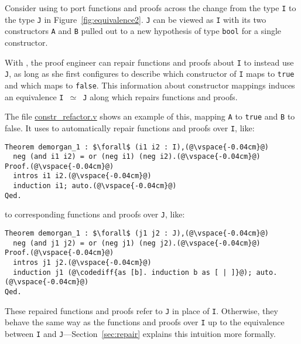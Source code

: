 Consider using \toolname to port functions and proofs across the change from the type \lstinline{I} to the type \lstinline{J} 
in Figure~\ref{fig:equivalence2}.
\lstinline{J} can be viewed as \lstinline{I} with its two constructors \lstinline{A} and \lstinline{B} pulled out to a
new hypothesis of type \lstinline{bool} for a single constructor.

With \toolname, the proof engineer can repair functions and proofs about \lstinline{I} to instead use \lstinline{J},
as long as she first configures \toolname to describe which constructor 
of \lstinline{I} maps to \lstinline{true} and which maps to \lstinline{false}.
This information about constructor mappings induces an equivalence \lstinline{I }$\simeq$\lstinline{ J}
along which \toolname repairs functions and proofs.

The file \href{https://github.com/uwplse/pumpkin-pi/blob/master/plugin/coq/playground/constr_refactor.v}{constr_refactor.v}
shows an example of this, mapping \lstinline{A} to \lstinline{true} and \lstinline{B} to false.
It uses \toolname to automatically repair functions and proofs over \lstinline{I}, like:

\begin{lstlisting}
Theorem demorgan_1 : $\forall$ (i1 i2 : I),(@\vspace{-0.04cm}@)
  neg (and i1 i2) = or (neg i1) (neg i2).(@\vspace{-0.04cm}@)
Proof.(@\vspace{-0.04cm}@)
  intros i1 i2.(@\vspace{-0.04cm}@)
  induction i1; auto.(@\vspace{-0.04cm}@)
Qed.
\end{lstlisting}
to corresponding functions and proofs over \lstinline{J}, like:

\begin{lstlisting}[backgroundcolor=\color{cyan!30}]
Theorem demorgan_1 : $\forall$ (j1 j2 : J),(@\vspace{-0.04cm}@)
  neg (and j1 j2) = or (neg j1) (neg j2).(@\vspace{-0.04cm}@)
Proof.(@\vspace{-0.04cm}@)
  intros j1 j2.(@\vspace{-0.04cm}@)
  induction j1 (@\codediff{as [b]. induction b as [ | ]}@); auto.(@\vspace{-0.04cm}@)
Qed.
\end{lstlisting}
These repaired functions and proofs refer to \lstinline{J} in place of \lstinline{I}.
Otherwise, they behave the same way as the functions and proofs over \lstinline{I} up to the equivalence between
\lstinline{I} and \lstinline{J}---Section~\ref{sec:repair} explains this intuition more formally.

